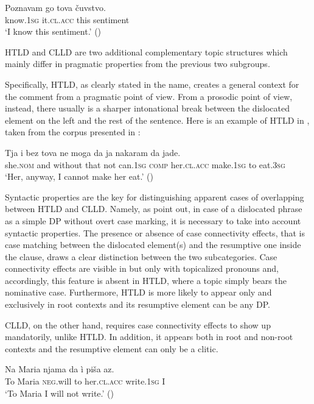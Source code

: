 \documentclass[output=paper,
colorlinks,
citecolor=brown,
newtxmath
]{langscibook}
\begin{document}
\ea\label{ex:zivojinovic:7}
\gll Poznavam go         tova čuvstvo.\\
     know.\textsc{1sg} it.\textsc{cl.acc} this sentiment  \\
\glt `I know this sentiment.'
\hfill ()
\z

\noindent HTLD and CLLD are two additional complementary topic structures which mainly differ in pragmatic properties from the previous two subgroups.

Specifically, HTLD, as clearly stated in the name, creates a general context for the comment from a pragmatic point of view. From a prosodic point of view, instead, there usually is a sharper intonational break between the dislocated element on the left and the rest of the sentence. Here is an example of HTLD in , taken from the corpus presented in \citet{Dzonova2004}:


\ea\label{ex:zivojinovic:8}
\gll Tja	 i	 bez     tova ne  moga	  da ja	        nakaram da jade.\\
     she.\textsc{nom} and without that not can.\textsc{1sg} \textsc{comp} her.\textsc{cl.acc} make.\textsc{1sg} to eat.\textsc{3sg}  \\
\glt `Her, anyway, I cannot make her eat.’ \hfill ()
\z

\noindent Syntactic properties are the key for distinguishing apparent cases of overlapping between HTLD and CLLD. Namely, as \citet{Cinque.Krapova2008} point out, in case of a dislocated phrase as a simple DP without overt case marking, it is necessary to take into account syntactic properties. The presence or absence of case connectivity effects, that is case matching between the dislocated element(s) and the resumptive one inside the clause, draws a clear distinction between the two subcategories. Case connectivity effects are visible in  but only with topicalized pronouns and, accordingly, this feature is absent in HTLD, where a topic simply bears the nominative case. Furthermore, HTLD is more likely to appear only and exclusively in root contexts and its resumptive element can be any DP.

CLLD, on the other hand, requires case connectivity effects to show up mandatorily, unlike HTLD. In addition, it appears both in root and non-root contexts and the resumptive element can only be a clitic.


\ea\label{ex:zivojinovic:9}
\gll Na Maria  njama    da  ì           piša       az.\\
     To Maria  \textsc{neg}.will to  her.\textsc{cl.acc}  write.\textsc{1sg}  I\\
\glt `To Maria I will not write.’
\hfill ()
\z
\end{document}
